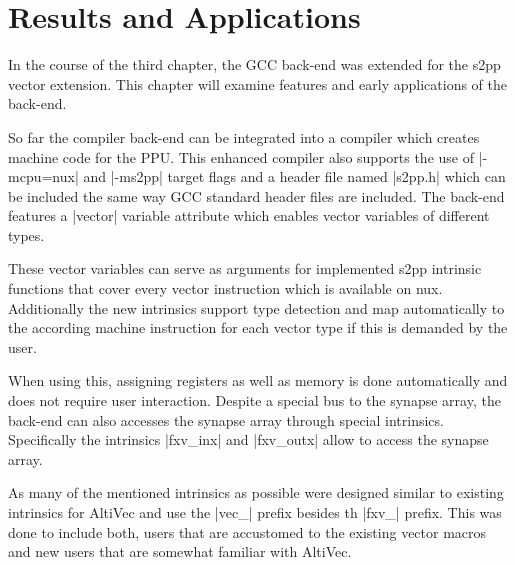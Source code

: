 \chapter{Results and Applications}
\label{ch:results}
In the course of the third chapter, the GCC back-end was extended for the s2pp vector extension.
This chapter will examine features and early applications of the back-end.

So far the compiler back-end can be integrated into a compiler which creates machine code for the PPU.
This enhanced compiler also supports the use of |-mcpu=nux| and |-ms2pp| target flags and a header file named |s2pp.h| which can be included the same way GCC standard header files are included.
The back-end features a |vector| variable attribute which enables vector variables of different types.

These vector variables can serve as arguments for implemented s2pp intrinsic functions that cover every vector instruction which is available on nux.
Additionally the new intrinsics support type detection and map automatically to the according machine instruction for each vector type if this is demanded by the user.

When using this, assigning registers as well as memory is done automatically and does not require user interaction.
Despite a special bus to the synapse array, the back-end can also accesses the synapse array through special intrinsics.
Specifically the intrinsics |fxv_inx| and |fxv_outx| allow to access the synapse array.

As many of the mentioned intrinsics as possible were designed similar to existing intrinsics for AltiVec and use the |vec_| prefix besides th |fxv_| prefix.
This was done to include both, users that are accustomed to the existing vector macros and new users that are somewhat familiar with AltiVec.


